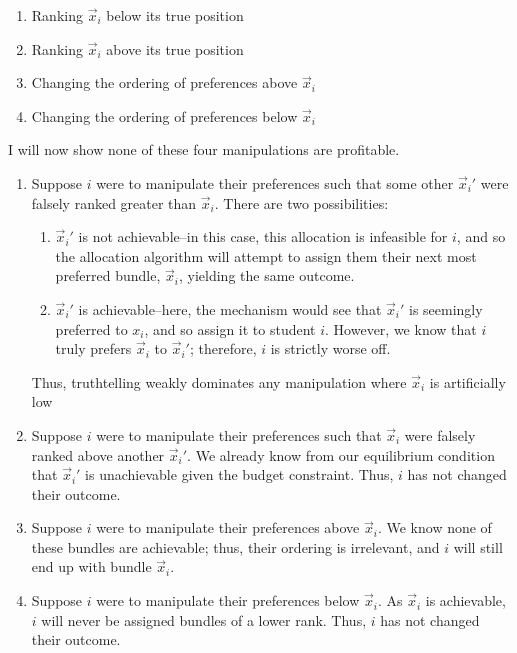 \documentclass{article}
\renewcommand{\v}{\vec{x}}
\begin{document}
\begin{enumerate}
    \item Ranking $\vec{x}_i$ below its true position
    
    \item Ranking $\vec{x}_i$ above its true position
    
    \item Changing the ordering of preferences above $\vec{x}_i$
    
    \item Changing the ordering of preferences below $\vec{x}_i$
\end{enumerate}

I will now show none of these four manipulations are profitable.

\begin{enumerate}

\item Suppose $i$ were to manipulate their preferences such that some other $\vec{x}_i'$ were falsely ranked greater than $\vec{x}_i$. There are two possibilities:
\begin{enumerate}
    \item $\vec{x}_i'$ is not achievable--in this case, this allocation is infeasible for $i$, and so the allocation algorithm will attempt to assign them their next most preferred bundle, $\vec{x}_i$, yielding the same outcome.
    
    \item $\vec{x}_i'$ is achievable--here, the mechanism would see that $\vec{x}_i'$ is seemingly preferred to $x_i$, and so assign it to student $i$. However, we know that $i$ truly prefers $\vec{x}_i$ to $\vec{x}_i'$; therefore, $i$ is strictly worse off.
\end{enumerate}

Thus, truthtelling weakly dominates any manipulation where $\v_i$ is artificially low

\item Suppose $i$ were to manipulate their preferences such that $\vec{x}_i$ were falsely ranked above another $\vec{x}_i'$. We already know from our equilibrium condition that $\v_i'$ is unachievable given the budget constraint. Thus, $i$ has not changed their outcome.

\item Suppose $i$ were to manipulate their preferences above $\v_i$. We know none of these bundles are achievable; thus, their ordering is irrelevant, and $i$ will still end up with bundle $\v_i$. 

\item Suppose $i$ were to manipulate their preferences below $\v_i$. As $\v_i$ is achievable, $i$ will never be assigned bundles of a lower rank. Thus, $i$ has not changed their outcome. 

\end{enumerate}
\end{document}
